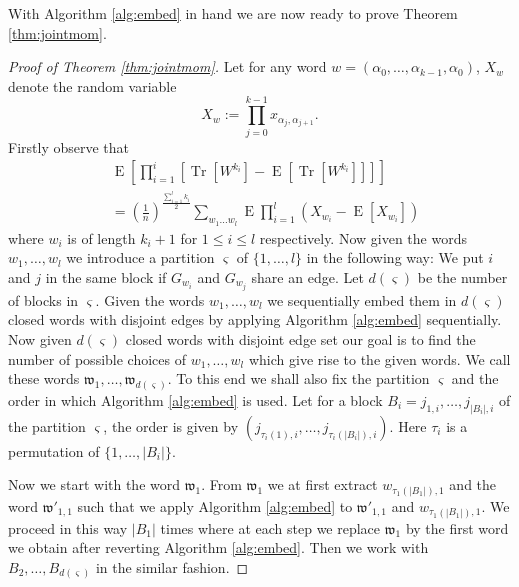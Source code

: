 \documentclass[12pt]{article}
\numberwithin{equation}{section}
\numberwithin{equation}{section}
\theoremstyle{definition}
\DeclareMathOperator{\E}{E} \DeclareMathOperator{\var}{Var}
\DeclareMathOperator{\Tr}{Tr}
\renewcommand{\1}{\bf 1}
\begin{document}
With Algorithm \ref{alg:embed} in hand we are now ready to prove Theorem \ref{thm:jointmom}.
\begin{proof}[Proof of Theorem \ref{thm:jointmom}]
Let for any word $w= \left(\alpha_{0},\ldots, \alpha_{k-1},\alpha_{0}\right)$, $X_{w}$ denote the random variable 
\begin{equation}
X_{w}:= \prod_{j=0}^{k-1} x_{\alpha_{j},\alpha_{j+1}}.
\end{equation}
 Firstly observe that 
\begin{equation}
\begin{split}
&\E\left[ \prod_{i=1}^{i} \left[\Tr\left[W^{k_{i}}\right] - \E\left[  \Tr\left[W^{k_{i}}\right]\right] \right] \right]\\
& = \left(\frac{1}{n}\right)^{\frac{\sum_{i=1}^{l}k_{i}}{2}}\sum_{w_{1}\ldots w_{l}} \E\prod_{i=1}^{l}\left( X_{w_{i}} - \E\left[ X_{w_{i}} \right] \right)
\end{split}
\end{equation}
where $w_{i}$ is of length $k_{i}+1$ for $1\le i \le l$ respectively. 
Now given the words $w_{1},\ldots, w_{l}$ we introduce a partition $\varsigma$ of $\{ 1,\ldots , l \}$ in the following way: We put $i$ and $j$ in the same block if $G_{w_{i}}$ and $G_{w_{j}}$ share an edge. Let $d(\varsigma)$ be the number of blocks in $\varsigma$. Given the words $w_{1},\ldots, w_{l}$ we sequentially embed them in $d(\varsigma)$ closed words with disjoint edges by applying Algorithm \ref{alg:embed} sequentially. Now given $d(\varsigma)$ closed words with disjoint edge set our goal is to find the number of possible choices of $w_{1},\ldots,w_{l}$ which give rise to the given words. We call these words $\mathfrak{w}_{1},\ldots, \mathfrak{w}_{d(\varsigma)}$. To this end we shall also fix the partition $\varsigma$ and the order in which Algorithm \ref{alg:embed} is used. Let for a block $B_{i}= {j_{1,i},\ldots, j_{| B_{i}|,i}}$ of the partition $\varsigma$, the order is given by $\left(j_{\tau_{i}(1),i},\ldots, j_{\tau_{i}(|B_{i}|),i}\right)$. Here $\tau_{i}$ is a permutation of $\{ 1,\ldots, |B_{i}|\}$.

\noindent 
Now we start with the word $\mathfrak{w}_{1}$. From $\mathfrak{w}_{1}$ we at first extract $w_{\tau_{1}(|B_{1}|),1}$ and the word $\mathfrak{w}'_{1,1}$ such that we apply Algorithm \ref{alg:embed} to  $\mathfrak{w}'_{1,1}$ and $w_{\tau_{1}(|B_{1}|),1}$. We proceed in this way $|B_{1}|$ times where at each step we replace $\mathfrak{w}_{1}$ by the first word we obtain after reverting Algorithm \ref{alg:embed}. Then we work with $B_{2},\ldots , B_{d(\varsigma)}$ in the similar fashion.


\end{proof}
\end{document}
